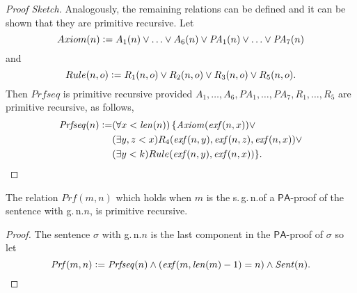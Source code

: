 \begin{proof}[Proof Sketch]
Analogously, the remaining relations can be defined and it can be shown that they are primitive recursive. Let 
\[ Axiom(n) \vcentcolon= A_1(n) \vee \ldots \vee A_6(n) \vee \mathit{PA}_1(n) \vee \ldots \vee \mathit{PA}_7(n) \]
and 
\[ Rule(n, o) \vcentcolon= R_1(n,o) \vee R_2(n,o) \vee R_3(n,o) \vee R_5(n,o). \] 
Then $\mathit{Prfseq}$ is primitive recursive provided $A_1, \ldots, A_6, \mathit{PA}_1, \ldots, \mathit{PA}_7, R_1, \ldots, R_5$ are primitive recursive, as follows,
\begin{align*}
\mathit{Prfseq}(n)  \vcentcolon= & ( \forall x < \mathit{len}(n)) \, \lbrace \mathit{Axiom}(\mathit{exf}(n,x))  \vee \\
&( \exists y, z < x )  R_4(\mathit{exf}(n,y), \mathit{exf}(n,z), \mathit{exf}(n,x)) \vee \\
&(\exists y < k )  Rule(\mathit{exf}(n,y), \mathit{exf}(n,x))\rbrace.
\end{align*}
\end{proof}
\begin{thm}\label{thm:prf}
The relation $\mathit{Prf}(m,n)$ which holds when $m$ is the s.\,g.\,n.\@ of a $\mathsf{PA}$-proof of the sentence with g.\,n.\@ $n$, is primitive recursive.
\end{thm}
\begin{proof}
The sentence $\sigma$ with g.\,n.\@ $n$ is the last component in the $\mathsf{PA}$-proof of $\sigma$ so let
\[ \mathit{Prf}(m,n) \vcentcolon= \mathit{Prfseq}(n) \wedge ( \mathit{exf}(m, \mathit{len}(m)-1)= n ) \wedge \mathit{Sent}(n). \]
\end{proof}